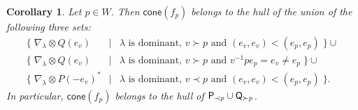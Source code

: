 \documentclass[sn-mathphys-num]{sn-jnl}%
\newcommand{\cone}{{\mathsf{cone}}}
\newtheorem{corollary}[theorem]{Corollary}
\theoremstyle{definition}
\begin{document}
\begin{corollary}\label{cor:cone-f_p}
Let $p\in W$. Then $\cone(f_p)$ belongs to the hull of the union of the
following three sets:
\begin{eqnarray*}
\{\;\nabla_\lambda\otimes Q(e_v)&\mid& \lambda \mbox{ is dominant,  } v\succ  p\mbox{ and }(e_v,e_v)<(e_p,e_p)\;\}\cup\\
\{\;\nabla_\lambda\otimes Q(e_v)&\mid& \lambda \mbox{ is dominant, }  v\succ p\mbox{ and }v^{-1} pe_p=e_v\neq e_p\;\}\cup\\
\{\;\nabla_\lambda\otimes P(-e_v)^*&\mid& \lambda \mbox{ is dominant, } v\prec p \mbox{ and }(e_v,e_v)<(e_p,e_p)\;\}.
\end{eqnarray*}
In particular, $\cone(f_p)$ belongs to the hull of $ {\sf P}_{\prec p}\cup {\sf Q}_{\succ p}$.
\end{corollary}
\end{document}
